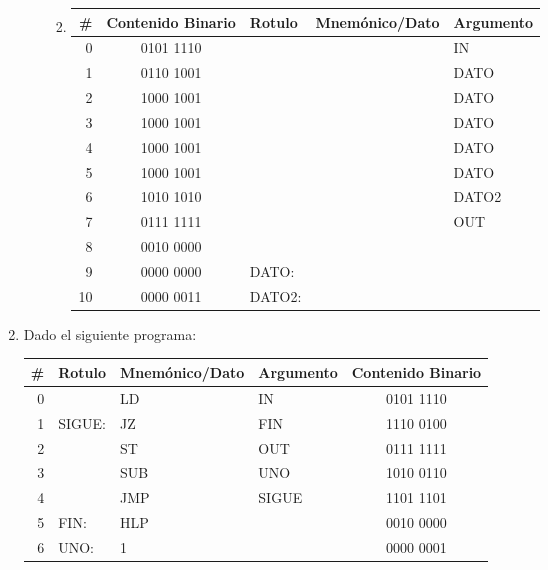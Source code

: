 \documentclass[12pt]{article}
\begin{document}
\begin{enumerate}
\begin{enumerate}
\begin{enumerate}
\begin{tabular}{|r||c||l|l|l|}
                \end{tabular}

                \item \begin{tabular}{|r||c||l|l|l|}

                    \hline

                    \textbf{\#} & \textbf{Contenido Binario} & \textbf{Rotulo}
                    & \textbf{Mnemónico/Dato} & \textbf{Argumento} \\
                    \hline
                    \hline

                    0 & 0101 1110 & & & IN\\ \hline
                    1 & 0110 1001 & & & DATO\\ \hline
                    2 & 1000 1001 & & & DATO\\ \hline
                    3 & 1000 1001 & & & DATO\\ \hline
                    4 & 1000 1001 & & & DATO\\ \hline
                    5 & 1000 1001 & & & DATO\\ \hline
                    6 & 1010 1010 & & & DATO2\\ \hline
                    7 & 0111 1111 & & & OUT\\ \hline
                    8 & 0010 0000 & & & \\ \hline
                    9 & 0000 0000 & DATO: & & \\ \hline
                    10 & 0000 0011 & DATO2: & & \\ \hline

                \end{tabular}

            \end{enumerate}
        \end{enumerate}

    \item Dado el siguiente programa:

        \begin{tabular}{|r||l|l|l||c|}

            \hline

            \textbf{\#} & \textbf{Rotulo} & \textbf{Mnemónico/Dato} &
            \textbf{Argumento} & \textbf{Contenido Binario} \\
            \hline
            \hline

            0 & & LD & IN & 0101 1110\\ \hline
            1 & SIGUE: & JZ & FIN & 1110 0100\\ \hline
            2 & & ST & OUT & 0111 1111\\ \hline
            3 & & SUB & UNO & 1010 0110\\ \hline
            4 & & JMP & SIGUE & 1101 1101\\ \hline
            5 & FIN: & HLP & & 0010 0000\\ \hline
            6 & UNO: & 1 & & 0000 0001\\ \hline


\end{tabular}
\end{enumerate}
\end{document}
